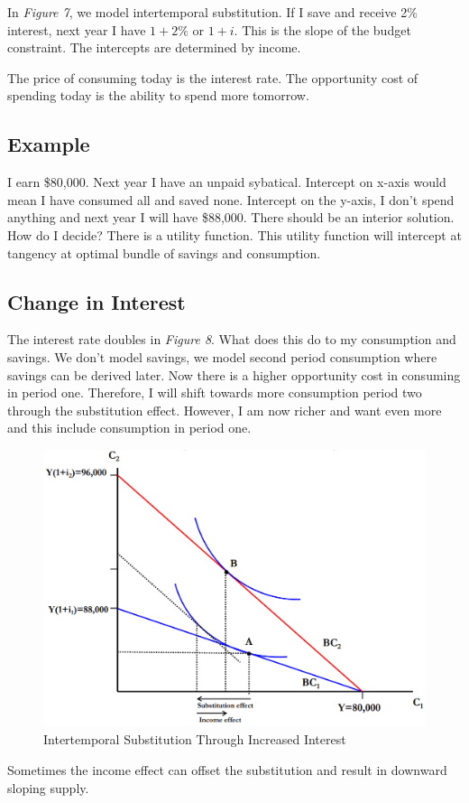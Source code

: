 \documentclass{article}
\begin{document}
In \textit{Figure 7}, we model intertemporal substitution. If I save and receive
2\% interest, next year I have $1+2\%$ or $1+i$. This is the slope of the budget
constraint. The intercepts are determined by income.

The price of consuming today is the interest rate. The opportunity cost of
spending today is the ability to spend more tomorrow.

\subsection{Example}

I earn \$80,000. Next year I have an unpaid sybatical. Intercept on x-axis would
mean I have consumed all and saved none. Intercept on the y-axis, I don't spend
anything and next year I will have \$88,000. There should be an interior
solution. How do I decide? There is a utility function. This utility function
will intercept at tangency at optimal bundle of savings and consumption.


\subsection{Change in Interest}

The interest rate doubles in \textit{Figure 8}. What does this do to my
consumption and savings. We don't model savings, we model second period
consumption where savings can be derived later. Now there is a higher
opportunity cost in consuming in period one. Therefore, I will shift towards
more consumption period two through the substitution effect. However, I am now
richer and want even more and this include consumption in period one.

\begin{figure}[H]
    \centering
    \includegraphics[scale=0.33]{"Figure 8"}
    \caption{Intertemporal Substitution Through Increased Interest}
\end{figure}

Sometimes the income effect can offset the substitution and result in downward
sloping supply.
\end{document}
